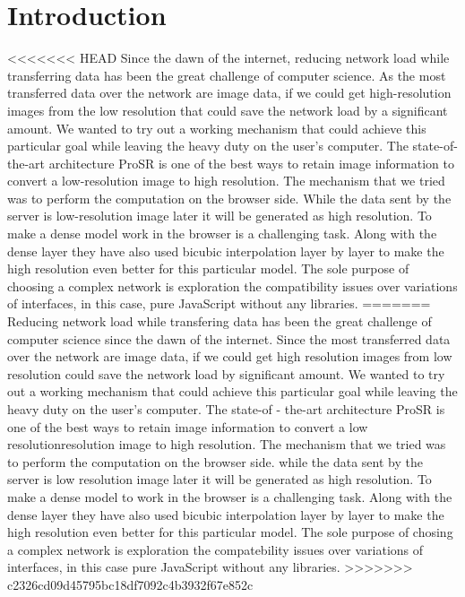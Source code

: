 \documentclass[a4paper,12pt]{article}
\begin{document}
\section{Introduction}
<<<<<<< HEAD
Since the dawn of the internet, reducing network load while transferring data has been the great challenge of computer science. As the most transferred data over the network are image data, if we could get high-resolution images from the low resolution that could save the network load by a significant amount. We wanted to try out a working mechanism that could achieve this particular goal while leaving the heavy duty on the user's computer. The state-of-the-art architecture ProSR is one of the best ways to retain image information to convert a low-resolution image to high resolution. The mechanism that we tried was to perform the computation on the browser side. While the data sent by the server is low-resolution image later it will be generated as high resolution. To make a dense model work in the browser is a challenging task. Along with the dense layer they have also used bicubic interpolation layer by layer to make the high resolution even better for this particular model. The sole purpose of choosing a complex network is exploration the compatibility issues over variations of interfaces, in this case, pure JavaScript without any libraries.
=======
Reducing network load while transfering data has been the great challenge of computer science since the dawn of the internet. Since the most transferred data over the network are image data, if we could get high resolution images from low resolution could save the network load by significant amount. We wanted to try out a working mechanism that could achieve this particular goal while leaving the heavy duty on the user's computer. The state-of - the-art architecture ProSR is one of the best ways to retain image information to convert a low resolutionresolution image to high resolution. The mechanism that we tried was to perform the computation on the browser side. while the data sent by the server is low resolution image later it will be generated as high resolution. To make a dense model to work in the browser is a challenging task. Along with the dense layer they have also used bicubic interpolation layer by layer to make the high resolution even better for this particular model. The sole purpose of chosing a complex network is exploration the compatebility issues over variations of interfaces, in this case pure JavaScript without any libraries.
>>>>>>> c2326cd09d45795bc18df7092c4b3932f67e852c
\end{document}
